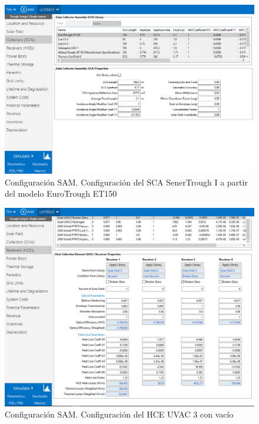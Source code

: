 \begin{figure}
\includegraphics[scale=0.8]{images/captura_sam02.png}
\caption{Configuración SAM. Configuración del SCA SenerTrough I a partir del modelo EuroTrough ET150} 
\label{fig:captura02}
\end{figure}

\begin{figure}
\includegraphics[scale=0.8]{images/captura_sam03.png}
\caption{Configuración SAM. Configuración del HCE UVAC 3 con vacío}
\label{fig:captura03}
\end{figure}


